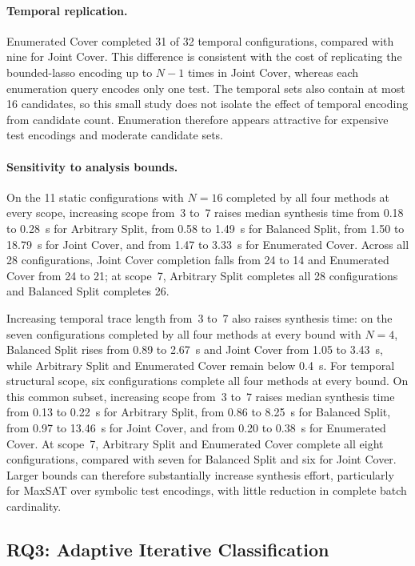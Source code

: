 \documentclass[runningheads]{llncs}
\newcommand{\methodname}[1]{\textup{\textsf{#1}}}
\newcommand{\arbitrarysplit}{\methodname{Arbitrary Split}}
\newcommand{\balancedsplit}{\methodname{Balanced Split}}
\newcommand{\jointcover}{\methodname{Joint Cover}}
\newcommand{\enumeratedcover}{\methodname{Enumerated Cover}}
\begin{document}
\paragraph{Temporal replication.}
\enumeratedcover{} completed 31 of 32 temporal configurations, compared
with nine for \jointcover{}. This difference is consistent with the cost
of replicating the bounded-lasso encoding up to $N-1$ times in
\jointcover{}, whereas each enumeration query encodes only one test.
The temporal sets also contain at most 16 candidates, so this small study
does not isolate the effect of temporal encoding from candidate count.
Enumeration therefore appears attractive for expensive test encodings and
moderate candidate sets.

\paragraph{Sensitivity to analysis bounds.}
On the 11 static configurations with $N=16$ completed by all four methods
at every scope, increasing scope from~3 to~7 raises median synthesis time
from 0.18 to 0.28~s for \arbitrarysplit{}, from 0.58 to 1.49~s for
\balancedsplit{}, from 1.50 to 18.79~s for \jointcover{}, and from
1.47 to 3.33~s for \enumeratedcover{}. Across all 28 configurations,
\jointcover{} completion falls from 24 to 14 and \enumeratedcover{} from
24 to 21; at scope~7, \arbitrarysplit{} completes all 28 configurations
and \balancedsplit{} completes 26.

Increasing temporal trace length from~3 to~7 also raises synthesis time:
on the seven configurations completed by all four methods at every bound
with $N=4$, \balancedsplit{} rises from 0.89 to 2.67~s and
\jointcover{} from 1.05 to 3.43~s, while \arbitrarysplit{} and
\enumeratedcover{} remain below 0.4~s.
For temporal structural scope, six configurations complete all four methods
at every bound. On this common subset, increasing scope from~3 to~7 raises
median synthesis time from 0.13 to 0.22~s for \arbitrarysplit{}, from
0.86 to 8.25~s for \balancedsplit{}, from 0.97 to 13.46~s for
\jointcover{}, and from 0.20 to 0.38~s for \enumeratedcover{}.
At scope~7, \arbitrarysplit{} and \enumeratedcover{} complete all eight
configurations, compared with seven for \balancedsplit{} and six for
\jointcover{}. Larger bounds can therefore substantially increase synthesis
effort, particularly for MaxSAT over symbolic test encodings, with little
reduction in complete batch cardinality.

\subsection{RQ3: Adaptive Iterative Classification}
\label{sec:rq3}
\end{document}
